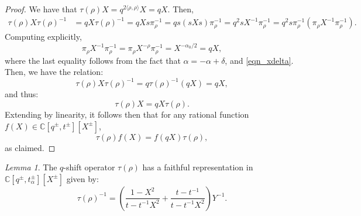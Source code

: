 \documentclass[a4paper]{report}
\theoremstyle{theorem}
\theoremstyle{definition}
\theoremstyle{remark}
\theoremstyle{proposition}
\theoremstyle{conjecture}
\theoremstyle{lemma}
\newtheorem{lemma}{Lemma}
\theoremstyle{corollary}
\theoremstyle{exercise}
\theoremstyle{example}
\newcommand{\C}{\mathbb{C}}
\begin{document}
  \begin{proof}
      We have that $\tau(\rho)X = q^{2\langle \rho, \rho\rangle} X = qX$. Then, 
      \begin{align*}
          \tau(\rho)X\tau(\rho)^{-1} &= qX\tau(\rho)^{-1} = q X s\pi_\rho^{-1} = q s(sXs)\pi_\rho^{-1} = q^2 sX^{-1} \pi_\rho^{-1} = q^2 s\pi_\rho^{-1}(\pi_\rho X^{-1} \pi_\rho^{-1}).
      \end{align*}
      Computing explicitly, 
      $$\pi_\rho X^{-1} \pi_\rho^{-1} = \pi_\rho X^{-\rho} \pi_\rho^{-1} = X^{-\alpha_0/2} = q X,$$
      where the last equality follows from the fact that $\alpha = -\alpha + \delta$, and 
      \eqref{eqn_xdelta}.
      Then, we have the relation:
      $$\tau(\rho) X \tau(\rho)^{-1} = q \tau(\rho)^{-1} (qX) = qX,$$
      and thus:
      \begin{equation}\label{eqn_stuff}
          \tau(\rho)X = qX\tau(\rho).
      \end{equation}
      Extending by linearity, it follows then that for any rational function $f(X) \in \C[q^\pm,t^\pm][X^\pm]$, 
      $$\tau(\rho)f(X) = f(qX)\tau(\rho),$$
      as claimed.
  \end{proof}
  
  \begin{lemma}
      The $q$-shift operator $\tau(\rho)$ has a faithful representation in 
      $\C[q^\pm,t_\alpha^\pm][X^\pm]$ given by:
      $$\tau(\rho)^{-1} = \left(\frac{1-X^2}{t-t^{-1}X^2} + \frac{t-t^{-1}}{t-t^{-1}X^2}\right)Y^{-1}.$$
  \end{lemma}
  
\end{document}
